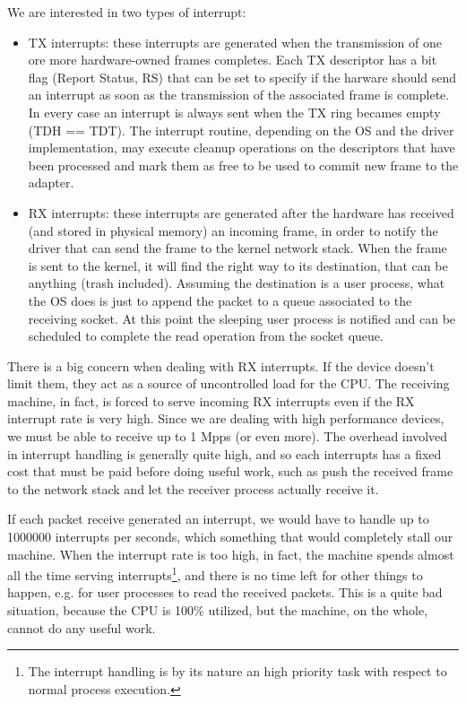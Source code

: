 We are interested in two types of interrupt:
\begin{itemize}
    \item TX interrupts: these interrupts are generated when the transmission of one ore more hardware-owned frames completes. Each TX 
	  descriptor has
	  a bit flag (Report Status, RS) that can be set to specify if the harware should send an interrupt as soon as the transmission 
	  of the associated
	  frame is complete. In every case an interrupt is always sent when the TX ring becames empty (TDH == TDT).
	  The interrupt routine, depending on the OS and the driver implementation, may execute cleanup operations on the descriptors 
	  that have been processed and mark them as free to be used to commit new frame to the adapter.
	      
    \item RX interrupts: these interrupts are generated after the hardware has received (and stored in physical memory) an incoming frame, 
	  in order to notify the driver that can send the frame to the kernel network stack. When the frame is sent to the kernel, it will
	  find the right way to its destination, that can be anything (trash included). Assuming the destination is a user process,
	  what the OS does is just to append the packet to a queue associated to the receiving socket. At this point the sleeping user
	  process is notified and can be scheduled to complete the read operation from the socket queue.
\end{itemize}

There is a big concern when dealing with RX interrupts. If the device doesn't limit them, they act as a source of uncontrolled load for the 
CPU.
The receiving machine, in fact, is forced to serve incoming RX interrupts even if the RX interrupt rate is very high. Since we are
dealing with high performance devices, we must be able to receive up to 1 Mpps (or even more).
The overhead involved in interrupt handling is generally quite high, and so each interrupts has a fixed cost that must be paid before
doing useful work, such as push the received frame to the network stack and let the receiver process actually receive it.

If each packet receive generated an interrupt, we would have to handle up to 1000000 interrupts per seconds, which something that would
completely stall our machine.
When the interrupt rate is too high, in fact, the machine spends almost all the time serving interrupts\footnote{The interrupt handling is
by its nature an high priority task with respect to normal process execution.}, and there is no time left for other things to happen,
e.g. for user processes to read the received packets. This is a quite bad situation, because the CPU is 100\% utilized, but the machine,
on the whole, cannot do any useful work.

